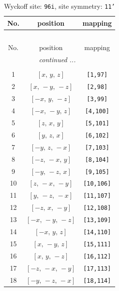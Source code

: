 \documentclass[fleqn,8pt]{jsarticle}
\begin{document}
\begin{longtable}{ccc}
\caption{Wyckoff site: {\tt 96i}, site symmetry: {\tt 11'}}
 \\
 \hline \hline
No. & position & mapping \\ \hline \endfirsthead

\multicolumn{2}{l}{\tablename\ \thetable{}} \\
 \hline \hline
No. & position & mapping \\ \hline \endhead

 \hline \hline
\multicolumn{2}{r}{\footnotesize\it continued ...} \\ \endfoot

 \hline \hline
\multicolumn{2}{r}{} \\ \endlastfoot

1 & $\left[ x,\, y,\, z \right]$ & {\tt [1,97]} \\ \hline
2 & $\left[ x,\, - y,\, - z \right]$ & {\tt [2,98]} \\ \hline
3 & $\left[ - x,\, y,\, - z \right]$ & {\tt [3,99]} \\ \hline
4 & $\left[ - x,\, - y,\, z \right]$ & {\tt [4,100]} \\ \hline
5 & $\left[ z,\, x,\, y \right]$ & {\tt [5,101]} \\ \hline
6 & $\left[ y,\, z,\, x \right]$ & {\tt [6,102]} \\ \hline
7 & $\left[ - y,\, z,\, - x \right]$ & {\tt [7,103]} \\ \hline
8 & $\left[ - z,\, - x,\, y \right]$ & {\tt [8,104]} \\ \hline
9 & $\left[ - y,\, - z,\, x \right]$ & {\tt [9,105]} \\ \hline
10 & $\left[ z,\, - x,\, - y \right]$ & {\tt [10,106]} \\ \hline
11 & $\left[ y,\, - z,\, - x \right]$ & {\tt [11,107]} \\ \hline
12 & $\left[ - z,\, x,\, - y \right]$ & {\tt [12,108]} \\ \hline
13 & $\left[ - x,\, - y,\, - z \right]$ & {\tt [13,109]} \\ \hline
14 & $\left[ - x,\, y,\, z \right]$ & {\tt [14,110]} \\ \hline
15 & $\left[ x,\, - y,\, z \right]$ & {\tt [15,111]} \\ \hline
16 & $\left[ x,\, y,\, - z \right]$ & {\tt [16,112]} \\ \hline
17 & $\left[ - z,\, - x,\, - y \right]$ & {\tt [17,113]} \\ \hline
18 & $\left[ - y,\, - z,\, - x \right]$ & {\tt [18,114]} \\ \hline

\end{longtable}
\end{document}
